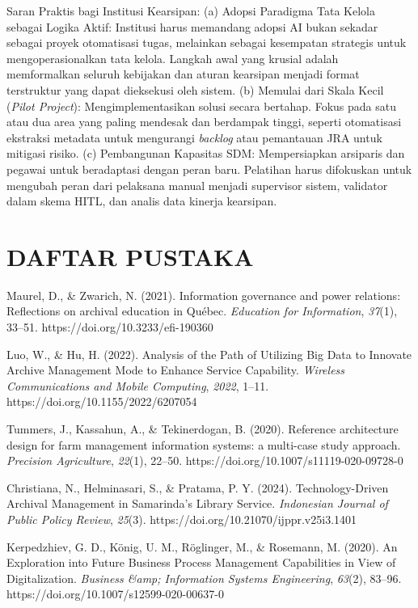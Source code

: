 Saran Praktis bagi Institusi Kearsipan: (a) Adopsi Paradigma Tata Kelola
sebagai Logika Aktif: Institusi harus memandang adopsi AI bukan sekadar
sebagai proyek otomatisasi tugas, melainkan sebagai kesempatan strategis
untuk mengoperasionalkan tata kelola. Langkah awal yang krusial adalah
memformalkan seluruh kebijakan dan aturan kearsipan menjadi format
terstruktur yang dapat dieksekusi oleh sistem. (b) Memulai dari Skala
Kecil (\emph{Pilot Project}): Mengimplementasikan solusi secara
bertahap. Fokus pada satu atau dua area yang paling mendesak dan
berdampak tinggi, seperti otomatisasi ekstraksi metadata untuk
mengurangi \emph{backlog} atau pemantauan JRA untuk mitigasi risiko. (c)
Pembangunan Kapasitas SDM: Mempersiapkan arsiparis dan pegawai untuk
beradaptasi dengan peran baru. Pelatihan harus difokuskan untuk mengubah
peran dari pelaksana manual menjadi supervisor sistem, validator dalam
skema HITL, dan analis data kinerja kearsipan.

\hypertarget{daftar-pustaka}{%
\section{DAFTAR PUSTAKA}\label{daftar-pustaka}}

Maurel, D., \& Zwarich, N. (2021). Information governance and power
relations: Reflections on archival education in Québec. \emph{Education
for Information}, \emph{37}(1), 33--51.
https://doi.org/10.3233/efi-190360

Luo, W., \& Hu, H. (2022). Analysis of the Path of Utilizing Big Data to
Innovate Archive Management Mode to Enhance Service Capability.
\emph{Wireless Communications and Mobile Computing}, \emph{2022}, 1--11.
https://doi.org/10.1155/2022/6207054

Tummers, J., Kassahun, A., \& Tekinerdogan, B. (2020). Reference
architecture design for farm management information systems: a
multi-case study approach. \emph{Precision Agriculture}, \emph{22}(1),
22--50. https://doi.org/10.1007/s11119-020-09728-0

Christiana, N., Helminasari, S., \& Pratama, P. Y. (2024).
Technology-Driven Archival Management in Samarinda's Library Service.
\emph{Indonesian Journal of Public Policy Review}, \emph{25}(3).
https://doi.org/10.21070/ijppr.v25i3.1401

Kerpedzhiev, G. D., König, U. M., Röglinger, M., \& Rosemann, M. (2020).
An Exploration into Future Business Process Management Capabilities in
View of Digitalization. \emph{Business \&amp; Information Systems
Engineering}, \emph{63}(2), 83--96.
https://doi.org/10.1007/s12599-020-00637-0

